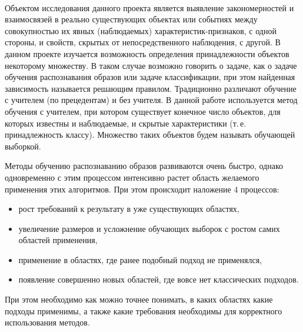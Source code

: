 \documentclass[12pt]{article}
\begin{document}
	 \\
	Объектом исследования данного проекта является выявление закономерностей и взаимосвязей в реально существующих объектах или событиях между совокупностью их явных (наблюдаемых) характеристик-признаков, с одной стороны, и свойств, скрытых от непосредственного наблюдения, с другой. 
	В данном проекте изучается возможность определения принадлежности объектов некоторому множеству. 
	В таком случае возможно говорить о задаче, как о задаче обучения распознавания образов или задаче классификации, при этом найденная зависимость называется решающим правилом. 
	Традиционно различают обучение с учителем (по прецедентам) и без учителя. 
	В данной работе используется метод обучения с учителем, при котором существует конечное число объектов, для которых известны и наблюдаемые, и скрытые характеристики (т.\,е. принадлежность классу). 
	Множество таких объектов будем называть обучающей выборкой.

	Методы обучению распознаванию образов развиваются очень быстро, однако одновременно с этим процессом интенсивно растет область желаемого применения этих алгоритмов. 
	При этом происходит наложение 4 процессов:
	\begin{itemize}
		\item рост требований к результату в уже существующих областях,
		\item увеличение размеров и усложнение обучающих выборок с ростом самих областей применения,
		\item применение в областях, где ранее подобный подход не применялся,
		\item появление совершенно новых областей, где вовсе нет классических подходов.
	\end{itemize}
	При этом необходимо как можно точнее понимать, в каких областях какие подходы применимы, а также какие требования необходимы для корректного использования методов.
\end{document}
